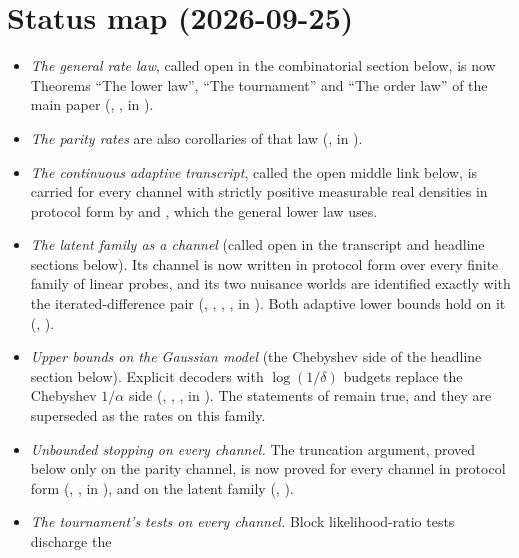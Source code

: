 \section*{Status map (2026-09-25)}
\begin{itemize}
\item \emph{The general rate law}, called open in the combinatorial section below, is now
Theorems ``The lower law'', ``The tournament'' and ``The order law'' of the main paper
(, ,  in
).
\item \emph{The parity rates} are also corollaries of that law
(,  in
).
\item \emph{The continuous adaptive transcript}, called the open middle link below, is carried
for every channel with strictly positive measurable real densities in protocol form by
 and
, which the general lower law uses.
\item \emph{The latent family as a channel} (called open in the transcript and headline sections below). Its channel is now
written in protocol form over every finite family of linear probes, and its two nuisance worlds
are identified exactly with the iterated-difference pair (, ,
, ,  in
). Both adaptive lower bounds hold on it
(, ).
\item \emph{Upper bounds on the Gaussian model} (the Chebyshev side of the headline section below). Explicit decoders with
$\log(1/\delta)$ budgets replace the Chebyshev $1/\alpha$ side (,
, ,  in
). The statements of  remain true,
and they are superseded as the rates on this family.
\item \emph{Unbounded stopping on every channel.} The truncation argument, proved below only
on the parity channel, is now proved for every channel in protocol form
(, , 
in ), and on the latent family
(, ).
\item \emph{The tournament's tests on every channel.} Block likelihood-ratio tests discharge the

\end{itemize}
